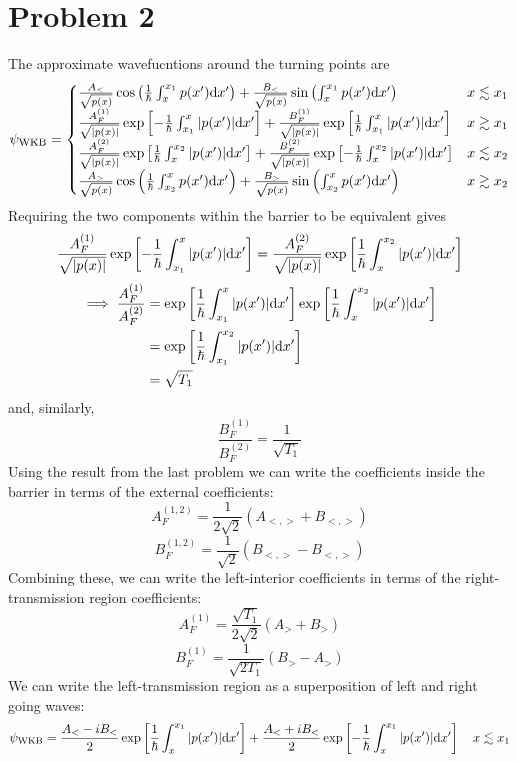\documentclass[12pt]{article}
\newcommand{\cint}[2]{\int_{#1}^{#2}}
\begin{document}
\section*{Problem 2}
The approximate wavefucntions around the turning points are
\[ \psi_\text{WKB} = \begin{cases}
    \frac{A_<}{\sqrt{p(x)}}\cos\left(\frac{1}{\hbar}\cint{x}{x_1}p(x')\dd x'\right) + \frac{B_<}{\sqrt{p(x)}}\sin\left(\cint{x}{x_1}p(x')\dd x'\right) & x \lesssim x_1 \\
    \frac{A_F^{(1)}}{\sqrt{\abs{p(x)}}}\exp\left[-\frac{1}{\hbar}\cint{x_1}{x}\abs{p(x')}\dd x'\right] + \frac{B_F^{(1)}}{\sqrt{\abs{p(x)}}}\exp\left[\frac{1}{\hbar}\cint{x_1}{x}\abs{p(x')}\dd x'\right] & x \gtrsim x_1 \\
    \frac{A_F^{(2)}}{\sqrt{\abs{p(x)}}}\exp\left[\frac{1}{\hbar}\cint{x}{x_2}\abs{p(x')}\dd x'\right] + \frac{B_F^{(2)}}{\sqrt{\abs{p(x)}}}\exp\left[-\frac{1}{\hbar}\cint{x}{x_2}\abs{p(x')}\dd x'\right] & x \lesssim x_2 \\
    \frac{A_>}{\sqrt{p(x)}}\cos\left(\frac{1}{\hbar}\cint{x_2}{x}p(x')\dd x'\right) + \frac{B_>}{\sqrt{p(x)}}\sin\left(\cint{x_2}{x}p(x')\dd x'\right) & x \gtrsim x_2
\end{cases} \]
Requiring the two components within the barrier to be equivalent gives
\[ \frac{A_F^{(1)}}{\sqrt{\abs{p(x)}}}\exp\left[-\frac{1}{\hbar}\cint{x_1}{x}\abs{p(x')}\dd x'\right] = \frac{A_F^{(2)}}{\sqrt{\abs{p(x)}}}\exp\left[\frac{1}{\hbar}\cint{x}{x_2}\abs{p(x')}\dd x'\right] \]
\begin{align*}
    \implies \frac{A_F^{(1)}}{A_F^{(2)}} & = \exp\left[\frac{1}{\hbar}\cint{x_1}{x}\abs{p(x')}\dd x'\right]\exp\left[\frac{1}{\hbar}\cint{x}{x_2}\abs{p(x')}\dd x'\right] \\
    & = \exp\left[\frac{1}{\hbar}\cint{x_1}{x_2}\abs{p(x')}\dd x'\right] \\
    & = \sqrt{T_1}
\end{align*}
and, similarly,
\[ \frac{B_F^{(1)}}{B_F^{(2)}} = \frac{1}{\sqrt{T_1}} \]
Using the result from the last problem we can write the coefficients inside the barrier in terms of the external coefficients:
\[ A_F^{(1,2)} = \frac{1}{2\sqrt{2}}(A_{<,>} + B_{<,>}) \]
\[ B_F^{(1,2)} = \frac{1}{\sqrt{2}}(B_{<,>} - B_{<,>}) \]
Combining these, we can write the left-interior coefficients in terms of the right-transmission region coefficients:
\[ A_F^{(1)} = \frac{\sqrt{T_1}}{2\sqrt{2}}(A_> + B_>) \]
\[ B_F^{(1)} = \frac{1}{\sqrt{2T_1}}(B_> - A_>) \]
We can write the left-transmission region as a superposition of left and right going waves:
\[ \psi_\text{WKB} = \frac{A_< - iB_<}{2}\exp\left[\frac{1}{\hbar}\cint{x}{x_1}\abs{p(x')}\dd x'\right] + \frac{A_< + iB_<}{2}\exp\left[-\frac{1}{\hbar}\cint{x}{x_1}\abs{p(x')}\dd x'\right] \quad x \lesssim x_1  \]
\end{document}

